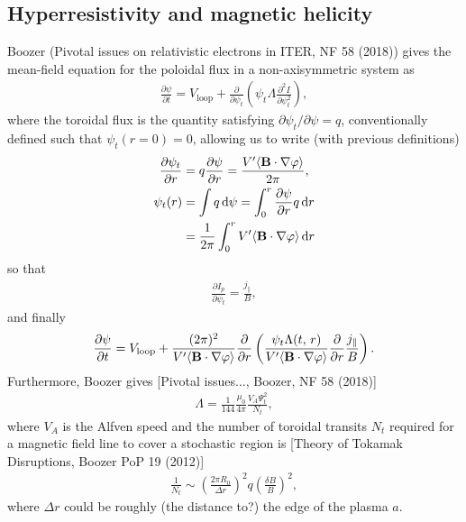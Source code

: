 \documentclass[11pt,a4paper]{article}
\newcommand{\rd}{\ensuremath{\mathrm{d}}}
\newcommand{\sub}[1]{\ensuremath{_{\text{#1}}}}
\renewcommand{\b}[1]{\ensuremath{ {\bf #1 } }}
\begin{document}
\subsection{Hyperresistivity and magnetic helicity}
Boozer (Pivotal issues on relativistic electrons in ITER, NF 58 (2018)) gives the mean-field equation for the poloidal flux in a non-axisymmetric system as
\begin{align}
\frac{\partial \psi}{\partial t} = V\sub{loop} + \frac{\partial}{\partial \psi_t}\left(\psi_t \Lambda \frac{\partial^2 I}{\partial \psi_t^2}\right),
\end{align}
where the toroidal flux is the quantity satisfying $\partial \psi_t/\partial \psi = q$, conventionally defined such that $\psi_t(r=0) = 0$, allowing us to write (with previous definitions) 
\begin{align}
\frac{\partial \psi_t}{\partial r} &= q\frac{\partial \psi}{\partial r} = \frac{V'\langle \b{B}\cdot\nabla\varphi \rangle}{2\pi}, \nonumber \\
\psi_t(r) &= \int q \,\rd \psi = \int_0^r \frac{\partial \psi}{\partial r}q\,\rd r \nonumber \\
&= \frac{1}{2\pi} \int_0^r V'\langle \b{B}\cdot\nabla\varphi\rangle\,\rd r
\end{align}
so that
\begin{align}
\frac{\partial I_p}{\partial \psi_t} = \frac{j_\parallel}{B},
\end{align}
and finally 
\begin{align}
\frac{\partial \psi}{\partial t} = V\sub{loop} + \frac{(2\pi)^2}{ V'\langle \b{B}\cdot\nabla\varphi\rangle}\frac{\partial}{\partial r}\left( \frac{\psi_t\Lambda(t,\,r)}{V'\langle \b{B}\cdot\nabla\varphi\rangle}  \frac{\partial}{\partial r}\frac{j_\parallel}{B}\right).
\end{align}
Furthermore, Boozer gives [Pivotal issues..., Boozer, NF 58 (2018)]
\begin{align}
\Lambda = \frac{1}{144} \frac{\mu_0}{4\pi}\frac{V_A \Psi_t^2}{N_t},
\end{align}
where $V_A$ is the Alfven speed and the number of toroidal transits $N_t$ required for a magnetic field line to cover a stochastic region is [Theory of Tokamak Disruptions, Boozer PoP 19 (2012)]
\begin{align}
\frac{1}{N_t} \sim \left(\frac{2\pi R_0}{\Delta r}\right)^2 q \left(\frac{\delta B}{B}\right)^2,
\end{align}
where $\Delta r$ could be roughly (the distance to?) the edge of the plasma $a$.
\end{document}
